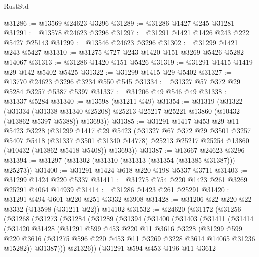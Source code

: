 \begin{lexlean}{RustStd}
\begin{coremodule}
@31286 := @13569 @24623 @3296
@31289 := @31286 @1427 @245 @31281
@31291 := @13578 @24623 @3296
@31297 := @31291 @1421 @1426 @243 @222 @5427 @25143
@31299 := @13546 @24623 @3296
@31302 := @31299 @1421 @243 @5427
@31310 := @31275 @727 @243 @1420 @151 @3269 @5426 @5282 @14067
@31313 := @31286 @1420 @151 @5426
@31319 := @31291 @1415 @1419 @29 @142 @5402 @5425
@31322 := @31299 @1415 @29 @5402
@31327 := @13770 @24623 @3296 @3234 @550 @545
@31334 := @31327 @57 @372 @29 @5284 @3257 @5387 @5397
@31337 := @31206 @49 @546 @49
@31338 := @31337 @5284
@31340 := @13598 (@31211 @49)
@31354 := @31319
    (@31322
      (@31334
        (@31338 @31340 @25208)
        @25213
        @25217
        @25221
        @13860
        (@10432 (@13862 @5397 @5388))
        @13693))
@31385 := @31291
    @1417
    @453
    @29
    @11
    @5423
    @3228
    (@31299
      @1417
      @29
      @5423
      (@31327
        @67
        @372
        @29
        @3501
        @3257
        @5407
        @5418
        (@31337 @3501 @31340 @14778)
        @25213
        @25217
        @25254
        @13860
        (@10432 (@13862 @5418 @5408))
        @13693))
@31387 := @13667 @24623 @3296
@31394 := @31297 (@31302 (@31310 (@31313 (@31354 (@31385 @31387))) @25273))
@31400 := @31291 @1424 @618 @220 @198 @5337 @3711
@31403 := @31299 @1424 @220 @5337
@31411 := @31275 @754 @220 @1423 @261 @3269 @25291 @4064 @14939
@31414 := @31286 @1423 @261 @25291
@31420 := @31291 @494 @601 @220 @251 @3332 @3908
@31428 := @31206 @22 @220 @22 @3332 (@13598 (@31211 @22)) @14102
@31532 := @24620
    (@31172
      (@31256
        (@31268
          (@31273
            (@31284
              (@31289
                (@31394
                  (@31400
                    (@31403
                      (@31411
                        (@31414
                          (@31420
                            @31428
                            (@31291
                              @599
                              @453
                              @220
                              @11
                              @3616
                              @3228
                              (@31299
                                @599
                                @220
                                @3616
                                (@31275 @596 @220 @453 @11 @3269 @3228 @3614 @14065 @31236 @15282))
                              @31387)))
                        @21326))
                    (@31291
                      @594
                      @453
                      @196
                      @11
                      @3612

\end{coremodule}
\end{lexlean}
